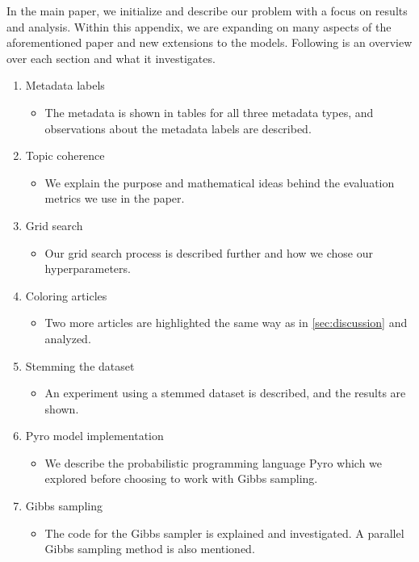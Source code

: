 In the main paper, we initialize and describe our problem with a focus on results and analysis.
Within this appendix, we are expanding on many aspects of the aforementioned paper and new extensions to the models.
Following is an overview over each section and what it investigates.

\begin{enumerate}
	\item Metadata labels
	\begin{itemize}
		\item The metadata is shown in tables for all three metadata types, and observations about the metadata labels are described.
	\end{itemize} 
	\item Topic coherence
	\begin{itemize}
		\item We explain the purpose and mathematical ideas behind the evaluation metrics we use in the paper.
	\end{itemize} 
	\item Grid search 
	\begin{itemize}
		\item Our grid search process is described further and how we chose our hyperparameters.
	\end{itemize}
	\item Coloring articles 
	\begin{itemize}
		\item Two more articles are highlighted the same way as in \autoref{sec:discussion} and analyzed.
	\end{itemize}
	\item Stemming the dataset 
	\begin{itemize}
		\item An experiment using a stemmed dataset is described, and the results are shown.
	\end{itemize}
	\item Pyro model implementation
	\begin{itemize}
		\item We describe the probabilistic programming language Pyro which we explored before choosing to work with Gibbs sampling.
	\end{itemize}
	\item Gibbs sampling
	\begin{itemize}
		\item The code for the Gibbs sampler is explained and investigated. A parallel Gibbs sampling method is also mentioned.

\end{itemize}
\end{enumerate}
